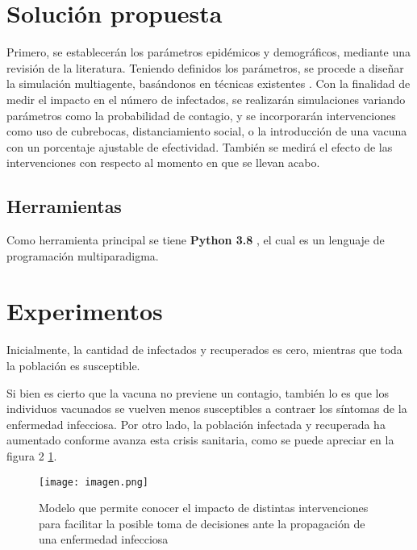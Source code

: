 \documentclass[a4]{sciposter}
\begin{document}
\begin{multicols}{2}
\section{Solución propuesta}

Primero, se establecerán los parámetros epidémicos y demográficos, mediante una revisión de la literatura. Teniendo definidos los parámetros, se procede a diseñar la simulación multiagente, basándonos en técnicas existentes \cite{transporte}. Con la finalidad de medir el impacto en el número de infectados, se realizarán simulaciones variando parámetros como la probabilidad
de contagio, y se incorporarán intervenciones como uso de cubrebocas, distanciamiento social, o la introducción de una vacuna con un porcentaje ajustable de efectividad. También se medirá el efecto de las intervenciones con respecto al momento en que se llevan acabo.

\subsection*{Herramientas}

Como herramienta principal se tiene \textbf{Python 3.8} \citep{python}, el cual es un lenguaje de programación multiparadigma.

\section{Experimentos}

Inicialmente, la cantidad de infectados y recuperados es cero, mientras que toda la población es susceptible.\par
Si bien es cierto que la vacuna no previene un contagio, también lo es que los individuos vacunados se vuelven menos susceptibles a contraer los síntomas de la enfermedad infecciosa. Por otro lado, la población infectada y recuperada ha aumentado conforme avanza esta crisis sanitaria, como se puede apreciar en la figura 2 \ref{imagen}.

\begin{figure}[h]
\setcounter{figure}{1}
\captionsetup{type=figure}
\begin{center}
   \texttt{[image: imagen.png]}
   \end{center}
    \caption{Modelo que permite conocer el impacto de distintas intervenciones para facilitar la posible toma de decisiones ante la propagación de una enfermedad infecciosa}
    \label{imagen}
    \centering
\end{figure}


\end{multicols}
\end{document}
